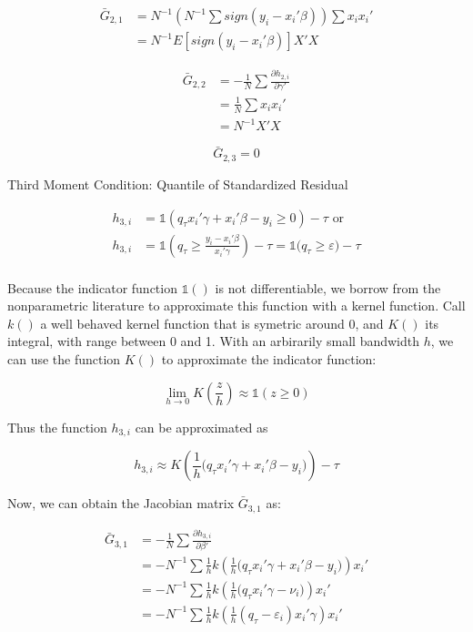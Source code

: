 \documentclass[
  authoryear,
  review,
  1p]{elsarticle}
\begin{document}
\[\begin{aligned}
\bar G_{2,1} &= N^{-1} \left(N^{-1}\sum sign(y_i-x_i'\beta)\right) \sum x_i x_i' \\
&= N^{-1} E[sign(y_i-x_i'\beta)] X'X
\end{aligned}
\]

\[\begin{aligned}
\bar G_{2,2} &= -\frac{1}{N} \sum \frac{\partial h_{2,i}}{\partial \gamma'} \\
             &=  \frac{1}{N} \sum x_i x_i' \\
             &= N^{-1} X'X
\end{aligned}
\]

\[\bar G_{2,3}=0\]

Third Moment Condition: Quantile of Standardized Residual

\[\begin{aligned}
h_{3,i} &= \mathbb{1}\left( q_\tau  x_i'\gamma +x_i'\beta - y_i \geq 0 \right) - \tau \text{ or}\\
h_{3,i} &= \mathbb{1}\left( q_\tau  \geq \frac{y_i- x_i'\beta}{x_i'\gamma}  \right) - \tau = \mathbb{1}\big( q_\tau \geq \varepsilon  \big) - \tau \\
\end{aligned}
\]

Because the indicator function \(\mathbb{1}()\) is not differentiable,
we borrow from the nonparametric literature to approximate this function
with a kernel function. Call \(k()\) a well behaved kernel function that
is symetric around 0, and \(K()\) its integral, with range between 0 and
1. With an arbirarily small bandwidth \(h\), we can use the function
\(K()\) to approximate the indicator function:

\[
\lim_{h\rightarrow 0} K\left(\frac{z}{h}\right) \approx \mathbb{1}(z\geq 0)
\]

Thus the function \(h_{3,i}\) can be approximated as

\[h_{3,i} \approx K\left( \frac{1}{h} \Big( q_\tau x_i'\gamma +x_i'\beta - y_i  \Big) \right) - \tau
\]

Now, we can obtain the Jacobian matrix \(\bar G_{3,1}\) as:

\[\begin{aligned}
\bar G_{3,1} &= -\frac{1}{N} \sum \frac{\partial h_{3,i}}{\partial \beta'} \\
             &= -N^{-1} \sum \frac{1}{h} k\left( \frac{1}{h} \Big( q_\tau x_i'\gamma +x_i'\beta - y_i  \Big) \right) x_i' \\ 
             &= -N^{-1} \sum \frac{1}{h} k\left( \frac{1}{h} \big( q_\tau x_i'\gamma - \nu_i \big)   \right) x_i'  \\
             &= -N^{-1} \sum \frac{1}{h} k\left( \frac{1}{h} ( q_\tau - \varepsilon_i ) x_i'\gamma  \right) x_i'  
\end{aligned}
\]
\end{document}

